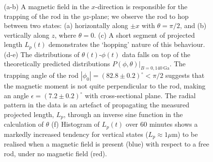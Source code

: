 \documentclass[aps,prl,superscriptaddress]{revtex4-1}
\begin{document}
\begin{figure}
\begin{subfigure}[b]{0.88\columnwidth}
    	\caption{\label{Pdata}}
    \end{subfigure}
    \caption{\footnotesize (a-b) A magnetic field in the $x$-direction is responsible for the trapping of the rod in the $yz$-plane; we observe the rod to hop between two states: (a) horizontally along $\pm x$ with $\theta=\pi/2$, and (b) vertically along $z$, where $\theta=0$. (c) A short segment of projected length $L_p(t)$ demonstrates the `hopping' nature of this behaviour. (d-e) The distributions of $\theta(t)$-$\phi(t)$ data falls on top of the theoretically predicted distributions $P(\phi,\theta)|_{B=0,140\ \text{Ga}}$. The trapping angle of the rod $|\phi_0|=(82.8\pm0.2)^\circ < \pi/2$ suggests that the magnetic moment is not quite perpendicular to the rod, making an angle $\epsilon=(7.2\pm0.2)^\circ$ with cross-sectional plane. The radial pattern in the data is an artefact of propagating the measured projected length, $L_p$, through an inverse sine function in the calculation of $\theta$ (f) Histogram of $L_p(t)$ over 60 minutes shows a markedly increased tendency for vertical states ($L_p \approx 1 \mu$m) to be realised when a magnetic field is present (blue) with respect to a free rod, under no magnetic field (red).}
\end{figure}
\end{document}
